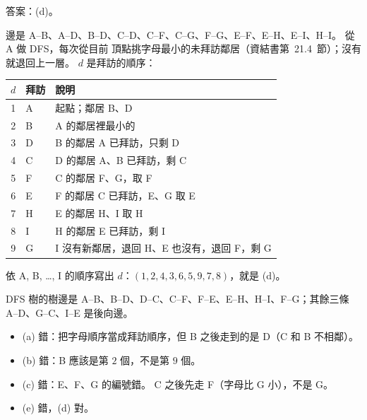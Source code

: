 \begin{pastsoln}
答案：(d)。

邊是 A--B、A--D、B--D、C--D、C--F、C--G、F--G、E--F、E--H、E--I、H--I。 從 A 做 DFS，每次從目前
頂點挑字母最小的未拜訪鄰居（資結書第~21.4~節）；沒有就退回上一層。 $d$ 是拜訪的順序：
\begin{center}
\small
\begin{tabular}{cll}
\toprule
$d$ & 拜訪 & 說明 \\
\midrule
1 & A & 起點；鄰居 B、D \\
2 & B & A 的鄰居裡最小的 \\
3 & D & B 的鄰居 A 已拜訪，只剩 D \\
4 & C & D 的鄰居 A、B 已拜訪，剩 C \\
5 & F & C 的鄰居 F、G，取 F \\
6 & E & F 的鄰居 C 已拜訪，E、G 取 E \\
7 & H & E 的鄰居 H、I 取 H \\
8 & I & H 的鄰居 E 已拜訪，剩 I \\
9 & G & I 沒有新鄰居，退回 H、E 也沒有，退回 F，剩 G \\
\bottomrule
\end{tabular}
\end{center}
依 A, B, \ldots, I 的順序寫出 $d$：$(1, 2, 4, 3, 6, 5, 9, 7, 8)$，就是 (d)。

DFS 樹的樹邊是 A--B、B--D、D--C、C--F、F--E、E--H、H--I、F--G；其餘三條 A--D、G--C、I--E 是後向邊。
\begin{itemize}
\item (a) 錯：把字母順序當成拜訪順序，但 B 之後走到的是 D（C 和 B 不相鄰）。
\item (b) 錯：B 應該是第 $2$ 個，不是第 $9$ 個。
\item (c) 錯：E、F、G 的編號錯。 C 之後先走 F（字母比 G 小），不是 G。
\item (e) 錯，(d) 對。
\end{itemize}
\end{pastsoln}
